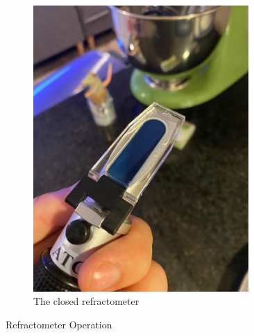 \documentclass{report}
\begin{document}
\begin{enumerate}
\begin{enumerate}[I]
\begin{figure}[H]
\begin{subfigure}{0.5\textwidth}
                \centering
                \includegraphics[width=0.9\textwidth, angle=-90]{ClosedRefractometer.jpg}
                \caption{The closed refractometer}
            \end{subfigure}
            \caption{Refractometer Operation}
        \end{figure}
        

\end{enumerate}
\end{enumerate}
\end{document}
